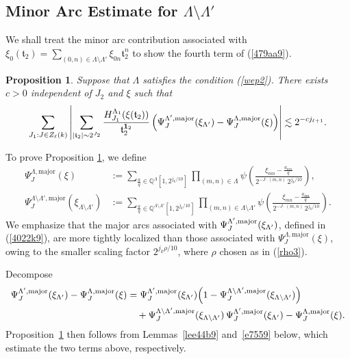 \documentclass[11 pt,letterpaper]{amsart}
\theoremstyle{plain}
\newtheorem{proposition}{Proposition}\numberwithin{proposition}{section}
\theoremstyle{definition}
\theoremstyle{remark} \theoremstyle{exam} \theoremstyle{ob}
\numberwithin{equation}{section}
\begin{document}
\subsection{Minor Arc Estimate for $\Lambda\setminus \Lambda'$}\label{5.4}
We  shall    treat the minor arc contribution associated with $\xi_0(\mathfrak{t}_2)=\sum_{(0,n)\in \Lambda\setminus \Lambda'} \xi_{0n}\mathfrak{t}_2^n$ to show   the fourth   term of (\ref{479aa9}). 
\begin{proposition}\label{prop7449}  
Suppose that $\Lambda$ satisfies   the  condition (\ref{wep2}). There exists $c>0$ independent of $J_2$ and  $\xi$ such that
$$\sum_{J_1:J\in Z_\ell(k)}\left|\sum_{|\mathfrak{t}_2|\sim 2^{J_2} }   \frac{H^{\Lambda_{1}}_{J_1}(\xi(\mathfrak{t}_2))}{\mathfrak{t}_2^{{\bf 1}_2} }  \left(\Psi^{\Lambda',\rm{major}}_{J}(\xi_{\Lambda'})-  \Psi^{\Lambda,\rm{major}}_{J}(\xi)  \right)\right|\lesssim 2^{-cj_{\ell+1}}.$$
\end{proposition}
To prove Proposition \ref{prop7449}, we define
\begin{align}\label{dom1}
\Psi_J^{\Lambda,\mathrm{major}}(\xi)
&:= \sum_{\frac{a}{q} \in \mathbb{Q}^{\Lambda}[1,2^{j_k/10}]}
\prod_{(m,n)\in \Lambda} 
\psi\left(
\frac{\xi_{mn}-\frac{a_{mn}}{q}}{2^{-J\cdot (m,n)}\,2^{j_k/10}}
\right),\\
\Psi_J^{\Lambda\setminus\Lambda',\mathrm{major}}(\xi_{\Lambda\setminus\Lambda'})
&:= \sum_{\frac{a}{q} \in \mathbb{Q}^{\Lambda\setminus\Lambda'}[1,2^{j_k/10}]}
\prod_{(m,n)\in \Lambda\setminus\Lambda'} 
\psi\left(
\frac{\xi_{mn}-\frac{a_{mn}}{q}}{2^{-J\cdot (m,n)}\,2^{j_k/10}}
\right).\nonumber
\end{align}
We emphasize that the major arcs associated with $\Psi^{\Lambda',\rm{major}}_{J}(\xi_{\Lambda'})$, defined in (\ref{4022k9}), are more tightly localized than those associated with $\Psi_J^{\Lambda,\mathrm{major}}(\xi)$, owing to the smaller scaling factor $2^{j_k\rho/10}$,  where  $\rho$ chosen  as in (\ref{rho3}). 

Decompose
\begin{align*}
\Psi_J^{\Lambda',\mathrm{major}}(\xi_{\Lambda'})
- \Psi_J^{\Lambda,\mathrm{major}}(\xi)
&=
\Psi_{J}^{\Lambda',\mathrm{major}}(\xi_{\Lambda'})
\Bigl(1 - \Psi_J^{\Lambda\setminus\Lambda',\mathrm{major}}(\xi_{\Lambda\setminus\Lambda'})\Bigr) \\
&\quad
+ \Psi_J^{\Lambda\setminus\Lambda',\mathrm{major}}(\xi_{\Lambda\setminus\Lambda'})\,
\Psi_{J}^{\Lambda',\mathrm{major}}(\xi_{\Lambda'})
- \Psi_J^{\Lambda,\mathrm{major}}(\xi).
\end{align*}
Proposition~\ref{prop7449} then follows from Lemmas~\ref{lee44b9} and~\ref{e7559} below, which estimate the two terms above, respectively.
\end{document}
